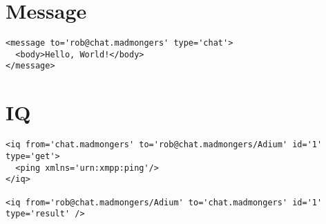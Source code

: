 \newpage
\section{Message}

\begin{shaded}
\begin{verbatim}
<message to='rob@chat.madmongers' type='chat'>
  <body>Hello, World!</body>
</message>
\end{verbatim}
\end{shaded}

\newpage
\section{IQ}

\begin{shaded}
\begin{verbatim}
<iq from='chat.madmongers' to='rob@chat.madmongers/Adium' id='1' type='get'>
  <ping xmlns='urn:xmpp:ping'/>
</iq>

<iq from='rob@chat.madmongers/Adium' to='chat.madmongers' id='1' type='result' />
\end{verbatim}
\end{shaded}

